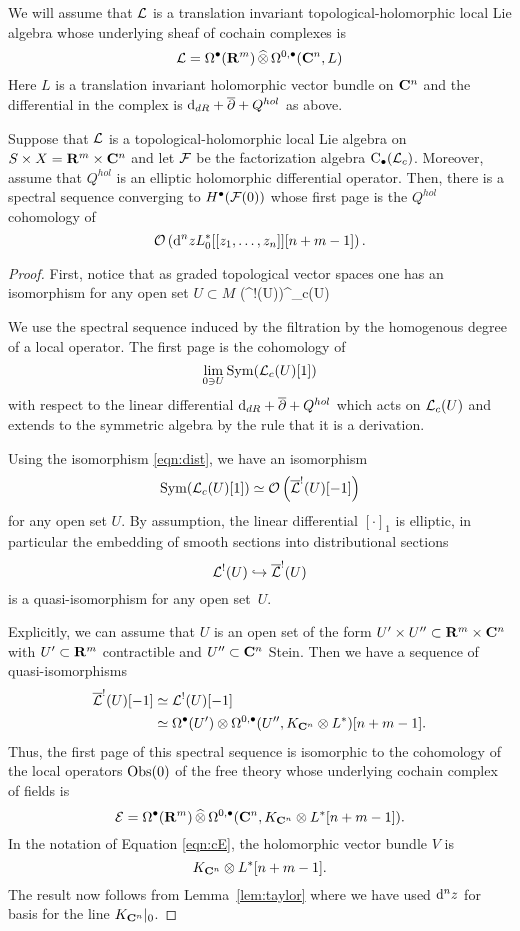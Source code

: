 We will assume that $\mathcal L$ is a translation invariant topological-holomorphic local Lie algebra whose underlying sheaf of cochain complexes is
\[
\mathcal L = \Omega^\bullet (\mathbf{R}^m) \, \widehat{\otimes} \, \Omega^{0,\bullet}(\mathbf{C}^n, L)
\]
Here $L$ is a translation invariant holomorphic vector bundle on $\mathbf{C}^n$ and the differential in the complex is ${\rm d}_{dR} + \overline{\partial} + Q^{hol}$ as above.

\begin{lem}
\label{lem:envelope}
Suppose that $\mathcal L$ is a topological-holomorphic local Lie algebra on $S \times X = \mathbf{R}^m \times \mathbf{C}^n$ and let $\mathcal F$ be the factorization algebra ${\rm C}_\bullet(\mathcal L_c)$.
Moreover, assume that $Q^{hol}$ is an elliptic holomorphic differential operator. 
Then, there is a spectral sequence converging to $H^\bullet(\mathcal F(0))$ whose first page is the $Q^{hol}$ cohomology of
\[
\mathcal O \left({\rm d}^n z L_0^*[[z_1,\ldots,z_n]] [n+m-1] \right) .
\]
\end{lem}
\begin{proof}
First, notice that as graded topological vector spaces one has an isomorphism for any open set $U \subset M$ 
\beqn\label{eqn:dist}
\left(\overline{\cL}^!(U)\right)^\vee \simeq \cL_c(U) 
\eeqn

We use the spectral sequence induced by the filtration by the homogenous degree of a local operator.
The first page is the cohomology of 
\[
\lim_{0 \ni U} \operatorname{Sym}(\mathcal L_c(U)[1]) 
\]
with respect to the linear differential ${\rm d}_{dR} + \overline{\partial} + Q^{hol}$ which acts on $\mathcal L_c(U)$ and extends to the symmetric algebra by the rule that it is a derivation.

Using the isomorphism \eqref{eqn:dist}, we have an isomorphism 
\[
\operatorname{Sym}(\mathcal L_c(U)[1]) \simeq \mathcal O\left(\overline{\mathcal L}^!(U)[-1]\right) 
\]
for any open set $U$.
By assumption, the linear differential $[\cdot]_1$ is elliptic, in particular the embedding of smooth sections into distributional sections
\[
\mathcal L^!(U) \hookrightarrow \overline{\mathcal L}^! (U)
\]
is a quasi-isomorphism for any open set~$U$. 

Explicitly, we can assume that $U$ is an open set of the form $U' \times U'' \subset \mathbf{R}^m \times \mathbf{C}^n$ with $U' \subset \mathbf{R}^m$ contractible and $U''\subset \mathbf{C}^n$ Stein.
Then we have a sequence of quasi-isomorphisms
\begin{align*}
\overline{\mathcal L}^! (U) [-1] & \simeq \mathcal L^!(U) [-1] \\ & \simeq \Omega^\bullet(U') \otimes \Omega^{0,\bullet}(U'',K_{\mathbf{C}^n} \otimes L^*)[n+m-1] . 
\end{align*}
Thus, the first page of this spectral sequence is isomorphic to the cohomology of the local operators $\operatorname{Obs}(0)$ of the free theory whose underlying cochain complex of fields is 
\[
\mathcal E = \Omega^\bullet(\mathbf{R}^m) \, \widehat{\otimes} \, \Omega^{0,\bullet}(\mathbf{C}^n , K_{\mathbf{C}^n} \otimes L^*[n+m-1]).
\]
In the notation of Equation \eqref{eqn:cE}, the holomorphic vector bundle $V$ is 
\[
K_{\mathbf{C}^n} \otimes L^*[n+m-1] .
\]
The result now follows from Lemma~\ref{lem:taylor} where we have used ${\rm d}^n z$ for basis for the line $K_{\mathbf{C}^n}|_0$. 
\end{proof}

